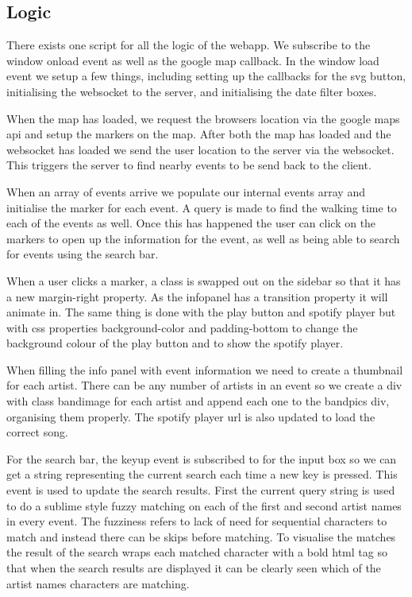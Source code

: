 \documentclass[10pt]{article}
\begin{document}
        \subsection{Logic}
            There exists one script for all the logic of the webapp. We subscribe to the window onload event as well as the google map callback. In the window load event we setup a few things, including setting up the callbacks for the svg button, initialising the websocket to the server, and initialising the date filter boxes.

            When the map has loaded, we request the browsers location via the google maps api and setup the markers on the map. After both the map has loaded and the websocket has loaded we send the user location to the server via the websocket. This triggers the server to find nearby events to be send back to the client.

            When an array of events arrive we populate our internal events array and initialise the marker for each event. A query is made to find the walking time to each of the events as well. Once this has happened the user can click on the markers to open up the information for the event, as well as being able to search for events using the search bar.

            When a user clicks a marker, a class is swapped out on the sidebar so that it has a new margin-right property. As the infopanel has a transition property it will animate in. The same thing is done with the play button and spotify player but with css properties background-color and padding-bottom to change the background colour of the play button and to show the spotify player.

            When filling the info panel with event information we need to create a thumbnail for each artist. There can be any number of artists in an event so we create a div with class bandimage for each artist and append each one to the bandpics div, organising them properly. The spotify player url is also updated to load the correct song.

            For the search bar, the keyup event is subscribed to for the input box so we can get a string representing the current search each time a new key is pressed. This event is used to update the search results. First the current query string is used to do a sublime style fuzzy matching on each of the first and second artist names in every event. The fuzziness refers to lack of need for sequential characters to match and instead there can be skips before matching. To visualise the matches the result of the search wraps each matched character with a bold html tag so that when the search results are displayed it can be clearly seen which of the artist names characters are matching.
\end{document}
